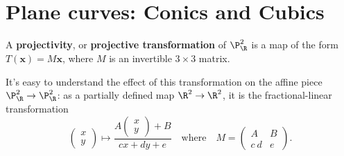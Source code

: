 \section{Plane curves: Conics and Cubics}
\begin{definition}
A \textbf{projectivity}, or \textbf{projective transformation} of $\P^2_\R$ is a map of the form $T(\bm{x})=M\bm{x}$, where $M$ is an invertible $3\times 3$ matrix. 
\end{definition}
It's easy to understand the effect of this transformation on the affine
piece $\P^2_\R\to\P^2_\R$: as a partially defined map $\R^2\to\R^2$, it is the fractional-linear transformation
\[\begin{pmatrix}
x\\
y
\end{pmatrix}\mapsto \frac{A\begin{pmatrix}
x\\
y
\end{pmatrix}+B}{cx+dy+e}\quad\text{where}\quad M=\begin{pmatrix}
A&B\\
c\ d&e
\end{pmatrix}.\]
